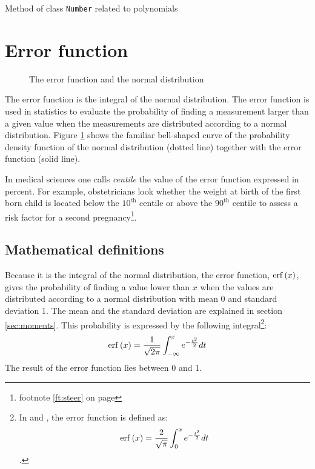 \documentclass[twoside]{book}
\begin{document}
\begin{listing}
Method of class {\tt Number} related to polynomials
\label{ls:polynomialNumber}

\end{listing}

\section{Error function}
\label{sec:errorFunction}
\begin{figure}
\center{}
\caption{The error function and the normal
distribution}\label{fig:errorFunction}
\end{figure}
The error function is the integral of the normal distribution. The
error function is used in statistics to evaluate the probability
of finding a measurement larger than a given value when the
measurements are distributed according to a normal distribution.
Figure \ref{sec:errorFunction} shows the familiar bell-shaped
curve of the probability density function of the normal
distribution (dotted line) together with the error function (solid
line).

In medical sciences one calls {\sl centile} the value of the error
function expressed in percent. For example, obstetricians look
whether the weight at birth of the first born child is located
below the $10^{\mbox{th}}$ centile or above the $90^{\mbox{th}}$
centile to assess a risk factor for a second
pregnancy\footnote{\cf footnote \ref{ft:steer} on page
\pageref{ft:steer}}.

\subsection{Mathematical definitions}
\label{sec:errorFunctionDef} Because it is the integral of the
normal distribution, the error function, $\mathop{\rm erf}\left(x\right)$,
gives the probability of finding a value lower than $x$ when the
values are distributed according to a normal distribution with
mean 0 and standard deviation 1. The mean and the standard
deviation are explained in section \ref{sec:moments}. This
probability is expressed by the following integral\footnote{In
\cite{AbrSteg} and \cite{Press}, the error function is defined as:
$$\mathop{\rm erf}\left(x\right)={2 \over \sqrt{\pi}}\int_0^x e^{-{t^2 \over 2
}}dt$$.}:
\begin{equation}
\mathop{\rm erf}\left(x\right)={1 \over \sqrt{2\pi}}\int_{-\infty}^x e^{-{t^2
\over 2 }}dt
\end{equation}
The result of the error function lies between 0 and 1.
\end{document}
